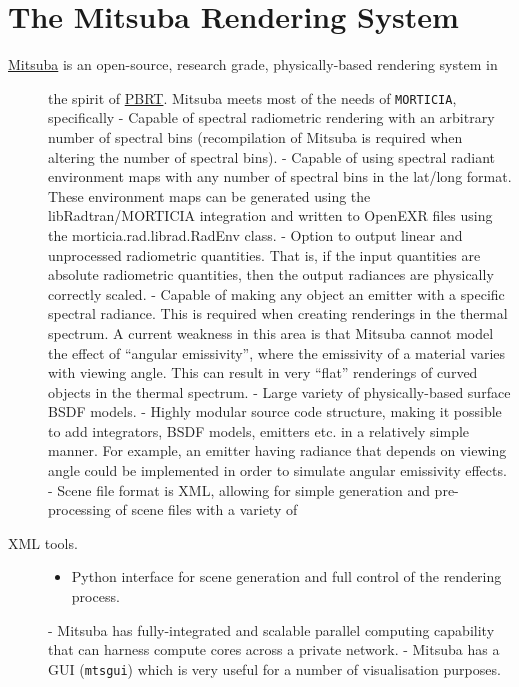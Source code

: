 \section{The Mitsuba Rendering
System}\label{the-mitsuba-rendering-system}

\begin{description}
\item[\href{http://www.mitsuba-renderer.org/}{Mitsuba} is an
open-source, research grade, physically-based rendering system in]
the spirit of \href{http://www.pbrt.org/}{PBRT}. Mitsuba meets most of
the needs of \texttt{MORTICIA}, specifically - Capable of spectral
radiometric rendering with an arbitrary number of spectral bins
(recompilation of Mitsuba is required when altering the number of
spectral bins). - Capable of using spectral radiant environment maps
with any number of spectral bins in the lat/long format. These
environment maps can be generated using the libRadtran/MORTICIA
integration and written to OpenEXR files using the
morticia.rad.librad.RadEnv class. - Option to output linear and
unprocessed radiometric quantities. That is, if the input quantities are
absolute radiometric quantities, then the output radiances are
physically correctly scaled. - Capable of making any object an emitter
with a specific spectral radiance. This is required when creating
renderings in the thermal spectrum. A current weakness in this area is
that Mitsuba cannot model the effect of ``angular emissivity'', where
the emissivity of a material varies with viewing angle. This can result
in very ``flat'' renderings of curved objects in the thermal spectrum. -
Large variety of physically-based surface BSDF models. - Highly modular
source code structure, making it possible to add integrators, BSDF
models, emitters etc. in a relatively simple manner. For example, an
emitter having radiance that depends on viewing angle could be
implemented in order to simulate angular emissivity effects. - Scene
file format is XML, allowing for simple generation and pre-processing of
scene files with a variety of
\item[XML tools.]
\begin{itemize}
\itemsep1pt\parskip0pt
\item
  Python interface for scene generation and full control of the
  rendering process.
\end{itemize}

- Mitsuba has fully-integrated and scalable parallel computing
capability that can harness compute cores across a private network. -
Mitsuba has a GUI (\texttt{mtsgui}) which is very useful for a number of
visualisation purposes.
\end{description}

